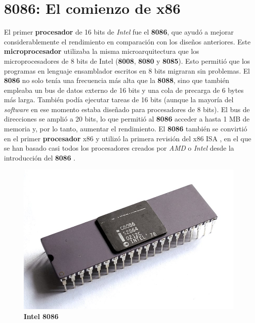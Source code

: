 \section{\textbf{8086}: El comienzo de x86}
El primer \textbf{procesador} de 16 bits de \emph{Intel} fue el \textbf{8086}, que ayudó a mejorar considerablemente el rendimiento en comparación
con los diseños anteriores. Este \textbf{microprocesador} utilizaba la misma microarquitectura que los microprocesadores de 8 bits de Intel
(\textbf{8008}, \textbf{8080} y \textbf{8085}). Esto permitió que los programas en lenguaje ensamblador escritos en 8 bits migraran sin
problemas. El \textbf{8086} no solo tenía una frecuencia más alta que la \textbf{8088}, sino que también empleaba un bus de datos externo
de 16 bits y una cola de precarga de 6 bytes más larga. También podía ejecutar tareas de 16 bits (aunque la mayoría del \emph{software} en
ese momento estaba diseñado para procesadores de 8 bits). El bus de direcciones se amplió a 20 bits, lo que permitió al \textbf{8086} acceder
a hasta 1 MB de memoria y, por lo tanto, aumentar el rendimiento. El \textbf{8086} también se convirtió en el primer \textbf{procesador} x86 y utilizó
la primera revisión del x86 ISA , en el que se han basado casi todos los procesadores creados por \emph{AMD}
o \emph{Intel} desde la introducción del \textbf{8086} .

\begin{figure}[htb]
	\centering
	\includegraphics[scale = 0.2]{Graphics/Intel_C8086.jpg}
	\caption{\textbf{Intel 8086}}
	\label{fig:16}
\end{figure}

